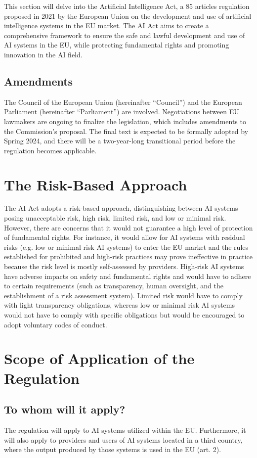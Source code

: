 This section will delve into the Artificial Intelligence Act, a 85 articles regulation proposed in 2021 by the European Union on the development and use of artificial intelligence systems in the EU market. \newline
The AI Act aims to create a comprehensive framework to ensure the safe and lawful development and use of AI systems in the EU, while protecting fundamental rights and promoting innovation in the AI field.
\subsection{Amendments} \label{sec:Amendments}
The Council of the European Union (hereinafter “Council”) and the European Parliament (hereinafter “Parliament”) are involved. Negotiations between EU lawmakers are ongoing to finalize the legislation, which includes amendments to the Commission's proposal. The final text is expected to be formally adopted by Spring 2024, and there will be a two-year-long transitional period before the regulation becomes applicable.
\section{The Risk-Based Approach} \label{sec:Risk-Based}
The AI Act adopts a risk-based approach, distinguishing between AI systems posing unacceptable risk, high risk, limited risk, and low or minimal risk. However, there are concerns that it would not guarantee a high level of protection of fundamental rights. For instance, it would allow for AI systems with residual risks (e.g. low or minimal risk AI systems) to enter the EU market and the rules established for prohibited and high-risk practices may prove ineffective in practice because the risk level is mostly self-assessed by providers. High-risk AI systems have adverse impacts on safety and fundamental rights and would have to adhere to certain requirements (such as transparency, human oversight, and the establishment of a risk assessment system). Limited risk would have to comply with light transparency obligations, whereas low or minimal risk AI systems would not have to comply with specific obligations but would be encouraged to adopt voluntary codes of conduct.

\section{Scope of Application of the Regulation} \label{sec:Regulation-Scope}
\subsection{To whom will it apply?}
The regulation will apply to AI systems utilized within the EU. Furthermore, it will also apply to providers and users of AI systems located in a third country, where the output produced by those systems is used in the EU (art. 2).

